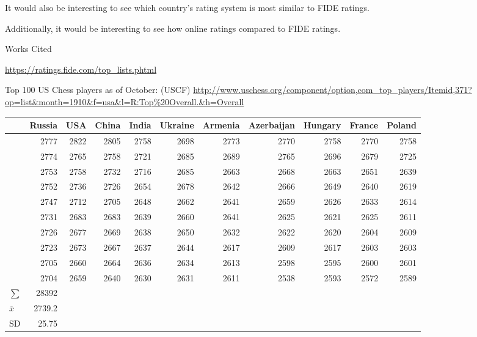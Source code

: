 \documentclass[12pt]{article}
\begin{document}
It would also be interesting to see which country's rating system is most similar to FIDE ratings.

Additionally, it would be interesting to see how online ratings compared to FIDE ratings.

\newpage
\begin{center}
Works Cited
\end{center}


\url{https://ratings.fide.com/top_lists.phtml}


Top 100 US Chess players as of October: (USCF)
\url{http://www.uschess.org/component/option,com_top_players/Itemid,371?op=list&month=1910&f=usa&l=R:Top%20Overall.&h=Overall}



\begin{center}
\begin{tabular}{lrrrrrrrrrr}
 & Russia & USA & China & India & Ukraine & Armenia & Azerbaijan & Hungary & France & Poland\\
\hline
 & 2777 & 2822 & 2805 & 2758 & 2698 & 2773 & 2770 & 2758 & 2770 & 2758\\
 & 2774 & 2765 & 2758 & 2721 & 2685 & 2689 & 2765 & 2696 & 2679 & 2725\\
 & 2753 & 2758 & 2732 & 2716 & 2685 & 2663 & 2668 & 2663 & 2651 & 2639\\
 & 2752 & 2736 & 2726 & 2654 & 2678 & 2642 & 2666 & 2649 & 2640 & 2619\\
 & 2747 & 2712 & 2705 & 2648 & 2662 & 2641 & 2659 & 2626 & 2633 & 2614\\
 & 2731 & 2683 & 2683 & 2639 & 2660 & 2641 & 2625 & 2621 & 2625 & 2611\\
 & 2726 & 2677 & 2669 & 2638 & 2650 & 2632 & 2622 & 2620 & 2604 & 2609\\
 & 2723 & 2673 & 2667 & 2637 & 2644 & 2617 & 2609 & 2617 & 2603 & 2603\\
 & 2705 & 2660 & 2664 & 2636 & 2634 & 2613 & 2598 & 2595 & 2600 & 2601\\
 & 2704 & 2659 & 2640 & 2630 & 2631 & 2611 & 2538 & 2593 & 2572 & 2589\\
\(\sum\) & 28392 &  &  &  &  &  &  &  &  & \\
    \(\overline{x}\) & 2739.2 &  &  &  &  &  &  &  &  & \\
SD & 25.75 &  &  &  &  &  &  &  &  & \\
\end{tabular}
\end{center}
\end{document}
